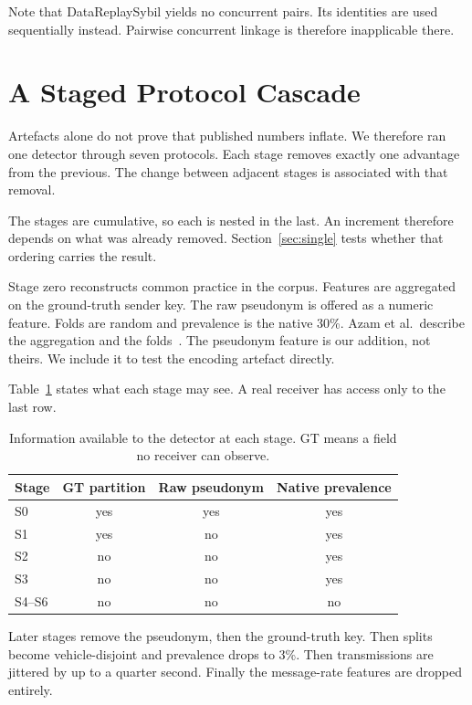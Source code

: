 \documentclass[conference]{IEEEtran}
\begin{document}
Note that DataReplaySybil yields no concurrent pairs.
Its identities are used sequentially instead.
Pairwise concurrent linkage is therefore inapplicable there.

\section{A Staged Protocol Cascade}
\label{sec:cascade}

Artefacts alone do not prove that published numbers inflate.
We therefore ran one detector through seven protocols.
Each stage removes exactly one advantage from the previous.
The change between adjacent stages is associated with that removal.

The stages are cumulative, so each is nested in the last.
An increment therefore depends on what was already removed.
Section~\ref{sec:single} tests whether that ordering carries the result.

Stage zero reconstructs common practice in the corpus.
Features are aggregated on the ground-truth sender key.
The raw pseudonym is offered as a numeric feature.
Folds are random and prevalence is the native 30\%.
Azam et al.\ describe the aggregation and the folds~\cite{azam2022}.
The pseudonym feature is our addition, not theirs.
We include it to test the encoding artefact directly.

Table~\ref{tab:observable} states what each stage may see.
A real receiver has access only to the last row.

\begin{table}[t]
\caption{Information available to the detector at each stage.
GT means a field no receiver can observe.}
\label{tab:observable}
\centering
\footnotesize
\begin{tabular}{@{}lccc@{}}
\toprule
Stage & GT partition & Raw pseudonym & Native prevalence \\
\midrule
S0 & yes & yes & yes \\
S1 & yes & no & yes \\
S2 & no & no & yes \\
S3 & no & no & yes \\
S4--S6 & no & no & no \\
\bottomrule
\end{tabular}
\end{table}

Later stages remove the pseudonym, then the ground-truth key.
Then splits become vehicle-disjoint and prevalence drops to 3\%.
Then transmissions are jittered by up to a quarter second.
Finally the message-rate features are dropped entirely.
\end{document}
